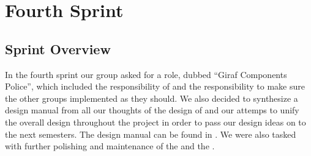 \part{Fourth Sprint}
\label{par:fourth_sprint}

\chapter{Sprint Overview}
In the fourth sprint our group asked for a role, dubbed ``Giraf Components Police'', which included the responsibility of \gc and the responsibility to make sure the other groups implemented \gc as they should. We also decided to synthesize a design manual from all our thoughts of the design of \giraf and our attemps to unify the overall design throughout the project in order to pass our design ideas on to the next semesters. The design manual can be found in . We were also tasked with further polishing and maintenance of the \ct and the \launcher. 









